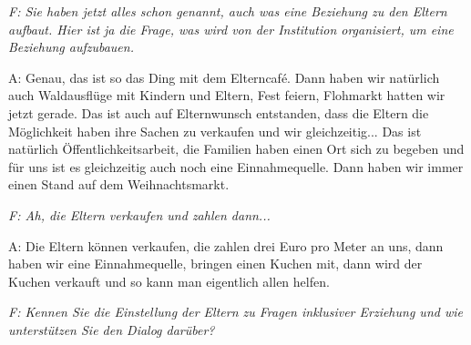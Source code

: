 \emph{F:  Sie haben jetzt alles schon genannt, auch was eine Beziehung zu den Eltern aufbaut.  
Hier ist ja die Frage, was wird von der Institution organisiert, um eine Beziehung aufzubauen.}

A:  Genau, das ist so das Ding mit dem Elterncafé. Dann haben wir natürlich auch Waldausflüge mit Kindern und Eltern, Fest feiern, Flohmarkt hatten wir jetzt gerade. Das ist auch auf Elternwunsch entstanden, dass die Eltern die Möglichkeit haben ihre Sachen zu verkaufen und wir gleichzeitig... Das ist natürlich Öffentlichkeitsarbeit, die Familien haben einen Ort sich zu begeben und für uns ist es gleichzeitig auch noch eine Einnahmequelle. Dann haben wir immer einen Stand auf dem Weihnachtsmarkt. 

\emph{F: Ah, die Eltern verkaufen und zahlen dann...}

A:  Die Eltern können verkaufen, die zahlen drei Euro pro Meter an uns, dann haben wir eine Einnahmequelle, bringen einen Kuchen mit, dann wird der Kuchen verkauft und so kann man eigentlich allen helfen. 

\emph{F: Kennen Sie die Einstellung der Eltern zu Fragen inklusiver Erziehung und wie unterstützen Sie den Dialog darüber?}


